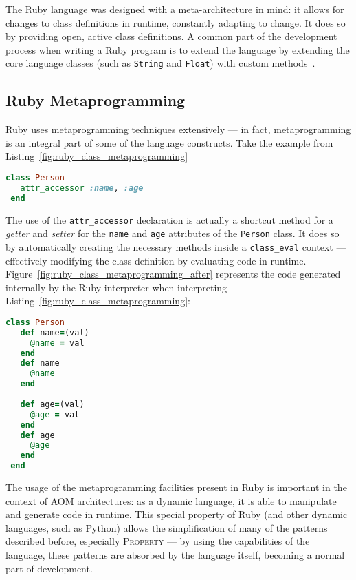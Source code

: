 The Ruby language was designed with a meta-architecture in mind: it allows for changes to class definitions in runtime, constantly adapting to change. It does so by providing open, active class definitions. A common part of the development process when writing a Ruby program is to extend the language by extending the core language classes (such as \verb!String! and \verb!Float!) with custom methods~\cite{metaprogramming_ruby}.

\subsection{Ruby Metaprogramming}\label{sec:ruby_metaprogramming}

Ruby uses metaprogramming techniques extensively --- in fact, metaprogramming is an integral part of some of the language constructs. Take the example from Listing~\ref{fig:ruby_class_metaprogramming}

\begin{lstlisting}[language=ruby, float=htb, label=fig:ruby_class_metaprogramming, caption=Metaprogramming in Ruby classes.]
 class Person
   attr_accessor :name, :age
 end
\end{lstlisting}

The use of the \verb!attr_accessor! declaration is actually a shortcut method for a \emph{getter} and \emph{setter} for the \verb!name! and \verb!age! attributes of the \verb!Person! class. It does so by automatically creating the necessary methods inside a \verb!class_eval! context --- effectively modifying the class definition by evaluating code in runtime. Figure~\ref{fig:ruby_class_metaprogramming_after} represents the code generated internally by the Ruby interpreter when interpreting Listing~\ref{fig:ruby_class_metaprogramming}:

\begin{lstlisting}[language=ruby, float=htb, label=fig:ruby_class_metaprogramming_after, caption=Code generated by Ruby metaprogramming constructs.]
 class Person
   def name=(val)
     @name = val
   end
   def name
     @name
   end
   
   def age=(val)
     @age = val
   end
   def age
     @age
   end
 end
\end{lstlisting}

The usage of the metaprogramming facilities present in Ruby is important in the context of AOM architectures: as a dynamic language, it is able to manipulate and generate code in runtime. This special property of Ruby (and other dynamic languages, such as Python) allows the simplification of many of the patterns described before, especially \textsc{Property} --- by using the capabilities of the language, these patterns are absorbed by the language itself, becoming a normal part of development.

